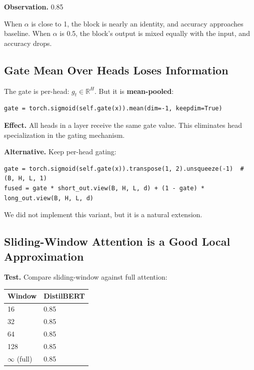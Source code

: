 \textbf{Observation.} 0.85

When $\alpha$ is close to 1, the block is nearly an identity, and accuracy 
approaches baseline. When $\alpha$ is 0.5, the block's output is mixed equally 
with the input, and accuracy drops.

\subsection{Gate Mean Over Heads Loses Information}

The gate is per-head: $g_t \in \mathbb{R}^H$. But it is \textbf{mean-pooled}:

\begin{lstlisting}
gate = torch.sigmoid(self.gate(x)).mean(dim=-1, keepdim=True)
\end{lstlisting}

\textbf{Effect.} All heads in a layer receive the same gate value. This 
eliminates head specialization in the gating mechanism.

\textbf{Alternative.} Keep per-head gating:

\begin{lstlisting}
gate = torch.sigmoid(self.gate(x)).transpose(1, 2).unsqueeze(-1)  # (B, H, L, 1)
fused = gate * short_out.view(B, H, L, d) + (1 - gate) * long_out.view(B, H, L, d)
\end{lstlisting}

We did not implement this variant, but it is a natural extension.

\subsection{Sliding-Window Attention is a Good Local Approximation}

\textbf{Test.} Compare sliding-window against full attention:

\begin{table}[H]
\centering
\small
\begin{tabular}{ll}
\toprule
\textbf{Window} & \textbf{DistilBERT} \\
\midrule
16 & 0.85 \\
32 & 0.85 \\
64 & 0.85 \\
128 & 0.85 \\
$\infty$ (full) & 0.85 \\
\bottomrule
\end{tabular}
\end{table}

